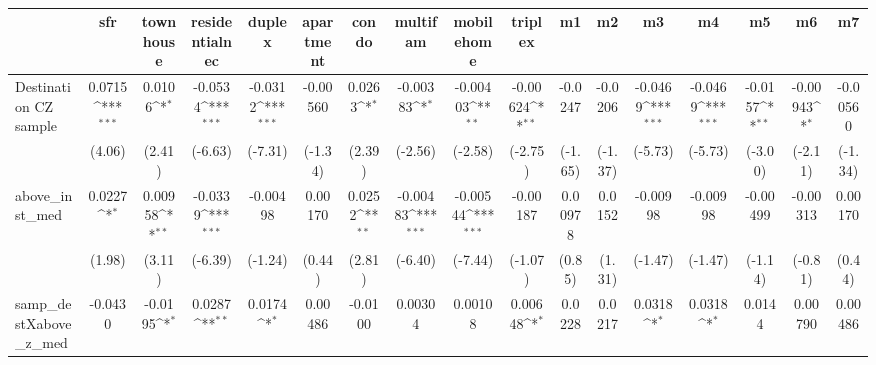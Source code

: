\begin{table}[htbp]\centering
\def\sym#1{\ifmmode^{#1}\else\(^{#1}\)\fi}
\caption{ \label{tab1}}
\begin{tabular}{l*{16}{c}}
\toprule
                    &\multicolumn{1}{c}{sfr}&\multicolumn{1}{c}{townhouse}&\multicolumn{1}{c}{residentialnec}&\multicolumn{1}{c}{duplex}&\multicolumn{1}{c}{apartment}&\multicolumn{1}{c}{condo}&\multicolumn{1}{c}{multifam}&\multicolumn{1}{c}{mobilehome}&\multicolumn{1}{c}{triplex}&\multicolumn{1}{c}{m1}&\multicolumn{1}{c}{m2}&\multicolumn{1}{c}{m3}&\multicolumn{1}{c}{m4}&\multicolumn{1}{c}{m5}&\multicolumn{1}{c}{m6}&\multicolumn{1}{c}{m7}\\
\midrule
Destination CZ sample&      0.0715\sym{***}&      0.0106\sym{*}  &     -0.0534\sym{***}&     -0.0312\sym{***}&    -0.00560         &      0.0263\sym{*}  &    -0.00383\sym{*}  &    -0.00403\sym{**} &    -0.00624\sym{**} &     -0.0247         &     -0.0206         &     -0.0469\sym{***}&     -0.0469\sym{***}&     -0.0157\sym{**} &    -0.00943\sym{*}  &    -0.00560         \\
                    &      (4.06)         &      (2.41)         &     (-6.63)         &     (-7.31)         &     (-1.34)         &      (2.39)         &     (-2.56)         &     (-2.58)         &     (-2.75)         &     (-1.65)         &     (-1.37)         &     (-5.73)         &     (-5.73)         &     (-3.00)         &     (-2.11)         &     (-1.34)         \\
\addlinespace
above\_inst\_med      &      0.0227\sym{*}  &     0.00958\sym{**} &     -0.0339\sym{***}&    -0.00498         &     0.00170         &      0.0252\sym{**} &    -0.00483\sym{***}&    -0.00544\sym{***}&    -0.00187         &     0.00978         &      0.0152         &    -0.00998         &    -0.00998         &    -0.00499         &    -0.00313         &     0.00170         \\
                    &      (1.98)         &      (3.11)         &     (-6.39)         &     (-1.24)         &      (0.44)         &      (2.81)         &     (-6.40)         &     (-7.44)         &     (-1.07)         &      (0.85)         &      (1.31)         &     (-1.47)         &     (-1.47)         &     (-1.14)         &     (-0.81)         &      (0.44)         \\
\addlinespace
samp\_destXabove\_z\_med&     -0.0430         &     -0.0195\sym{*}  &      0.0287\sym{**} &      0.0174\sym{*}  &     0.00486         &     -0.0100         &     0.00304         &     0.00108         &     0.00648\sym{*}  &      0.0228         &      0.0217         &      0.0318\sym{*}  &      0.0318\sym{*}  &      0.0144         &     0.00790         &     0.00486         \\

\end{tabular}
\end{table}
